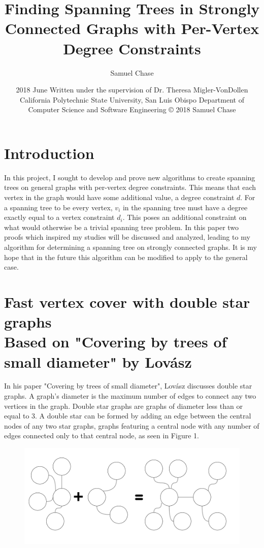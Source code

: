 \documentclass{article}
\title{Finding Spanning Trees in Strongly Connected Graphs with Per-Vertex Degree Constraints}
\author{Samuel Chase}
\date{2018 June \linebreak\linebreak
	\small{Written under the supervision of Dr. Theresa Migler-VonDollen\linebreak\linebreak
	California Polytechnic State University, San Luis Obispo \linebreak\linebreak
	Department of Computer Science and Software Engineering \linebreak\linebreak
	© 2018 Samuel Chase}}
\begin{document}
	\maketitle
	
	\tableofcontents
	\newpage
	\section{Introduction}
	In this project, I sought to develop and prove new algorithms to create spanning trees on general graphs with per-vertex degree constraints. 
	This means that each vertex in the graph would have some additional value, a degree constraint $d$. For a spanning tree to be every vertex, $v_{i}$ in the spanning tree must have a degree exactly equal to a vertex constraint $d_{i}$. This poses an additional constraint on what
	would otherwise be a trivial spanning tree problem. In this paper two proofs which inspired my studies will be discussed and analyzed, leading to my algorithm for determining a spanning tree on strongly connected graphs. It is my hope that in the future this algorithm can be modified to apply to the general case.
	
	
	
	\section{Fast vertex cover with double star graphs \\ {\small Based on "Covering by trees of small diameter" by Lov\'asz \cite{1}} }
	In his paper "Covering by trees of small diameter", Lov\'asz discusses double star graphs. A graph's diameter is the maximum number of edges to connect any two vertices in the graph. Double star graphs are graphs of diameter less than or equal to 3. A double star can be formed by adding an edge between the central nodes of any two star graphs, graphs featuring a central node with any number of edges connected only to that central node, as seen in Figure 1.
	\begin{figure}[H]
		\caption{}
		\includegraphics{Figure1}
	\end{figure}
	
\end{document}
